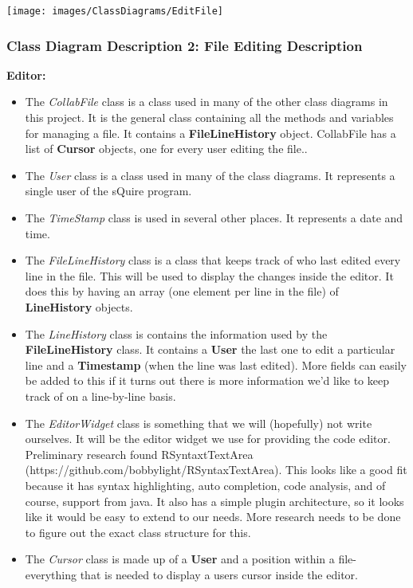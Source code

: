 \documentclass[twoside,letterpaper]{article}
\begin{document}
	\texttt{[image: images/ClassDiagrams/EditFile]}
	
	\newpage
	
	\subsubsection[Class Diagram Description 2: File Editing Description]{\rmfamily\bfseries\color{black}
		Class Diagram Description 2: File Editing Description}
	\hypertarget{RefHeading22059017292}{}
	
	\textbf{Editor:}\\
	\begin{itemize}
	\item The \textit{CollabFile} class is a class used in many of the other class diagrams in this project. It is the general class containing all the methods and variables for managing a file. It contains a \textbf{FileLineHistory} object. CollabFile has a list of \textbf{Cursor} objects, one for every user editing the file..
	  \item The \textit{User} class is a class used in many of the class diagrams. It represents a single user of the sQuire program.
	  \item The \textit{TimeStamp} class is used in several other places. It represents a date and time.
		\item The \textit{FileLineHistory} class is a class that keeps track of who last edited every line in the file. This will be used to display the changes inside the editor. It does this by having an array (one element per line in the file) of \textbf{LineHistory} objects.
	  \item The \textit{LineHistory} class is contains the information used by the \textbf{FileLineHistory} class. It contains a \textbf{User} {the last one to edit a particular line} and a \textbf{Timestamp} (when the line was last edited). More fields can easily be added to this if it turns out there is more information we'd like to keep track of on a line-by-line basis.
		\item The \textit{EditorWidget} class is something that we will (hopefully) not write ourselves. It will be the editor widget we use for providing the code editor. Preliminary research found RSyntaxtTextArea (https://github.com/bobbylight/RSyntaxTextArea). This looks like a good fit because it has syntax highlighting, auto completion, code analysis, and of course, support from java. It also has a simple plugin architecture, so it looks like it would be easy to extend to our needs. More research needs to be done to figure out the exact class structure for this.
	  \item The \textit{Cursor} class is made up of a \textbf{User} and a position within a file- everything that is needed to display a users cursor inside the editor.
	\end{itemize}
\end{document}
